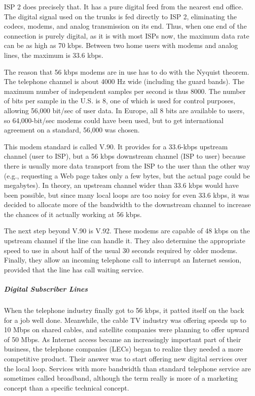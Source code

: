 ISP 2 does precisely that. It has a pure digital feed from the nearest
end office. The digital signal used on the trunks is fed directly to ISP
2, eliminating the codecs, modems, and analog transmission on its end.
Thus, when one end of the connection is purely digital, as it is with
most ISPs now, the maximum data rate can be as high as 70 kbps. Between
two home users with modems and analog lines, the maximum is 33.6 kbps.

The reason that 56 kbps modems are in use has to do with the Nyquist
theorem. The telephone channel is about 4000 Hz wide (including the
guard bands). The maximum number of independent samples per second is
thus 8000. The number of bits per sample in the U.S. is 8, one of which
is used for control purposes, allowing 56,000 bit/sec of user data. In
Europe, all 8 bits are available to users, so 64,000-bit/sec modems
could have been used, but to get international agreement on a standard,
56,000 was chosen.

This modem standard is called {V.90}. It provides for a 33.6-kbps
upstream channel (user to ISP), but a 56 kbps downstream channel (ISP to
user) because there is usually more data transport from the ISP to the
user than the other way (e.g., requesting a Web page takes only a few
bytes, but the actual page could be megabytes). In theory, an upstream
channel wider than 33.6 kbps would have been possible, but since many
local loops are too noisy for even 33.6 kbps, it was decided to allocate
more of the bandwidth to the downstream channel to increase the chances
of it actually working at 56 kbps.

The next step beyond V.90 is {V.92}. These modems are capable of 48 kbps
on the upstream channel if the line can handle it. They also determine
the appropriate speed to use in about half of the usual 30 seconds
required by older modems. Finally, they allow an incoming telephone call
to interrupt an Internet session, provided that the line has call
waiting service.

\protect\hypertarget{0130661023_ch02lev1sec5.htmlux5cux23ch02lev3sec10}{}{}

\subparagraph{Digital Subscriber Lines}

When the telephone industry finally got to 56 kbps, it patted itself on
the back for a job well done. Meanwhile, the cable TV industry was
offering speeds up to 10 Mbps on shared cables, and satellite companies
were planning to offer upward of 50 Mbps. As Internet access became an
increasingly important part of their business, the telephone companies
(LECs) began to realize they needed a more competitive product. Their
answer was to start offering new digital services over the local loop.
Services with more bandwidth than standard telephone service are
sometimes called {broadband}, although the term really is more of a
marketing concept than a specific technical concept.

